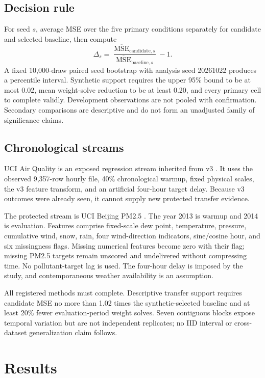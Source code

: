 \documentclass[10pt]{article}
\begin{document}
\subsection{Decision rule}
For seed $s$, average MSE over the five primary conditions separately for candidate and selected baseline, then compute
\[
 \Delta_s=\frac{\overline{\operatorname{MSE}}_{\mathrm{candidate},s}}
 {\overline{\operatorname{MSE}}_{\mathrm{baseline},s}}-1.
\]
A fixed 10,000-draw paired seed bootstrap with analysis seed 20261022 produces a percentile interval. Synthetic support requires the upper 95\% bound to be at most 0.02, mean weight-solve reduction to be at least 0.20, and every primary cell to complete validly. Development observations are not pooled with confirmation. Secondary comparisons are descriptive and do not form an unadjusted family of significance claims.

\subsection{Chronological streams}
UCI Air Quality is an exposed regression stream inherited from v3 \cite{air}. It uses the observed 9,357-row hourly file, 40\% chronological warmup, fixed physical scales, the v3 feature transform, and an artificial four-hour target delay. Because v3 outcomes were already seen, it cannot supply new protected transfer evidence.

The protected stream is UCI Beijing PM2.5 \cite{beijing}. The year 2013 is warmup and 2014 is evaluation. Features comprise fixed-scale dew point, temperature, pressure, cumulative wind, snow, rain, four wind-direction indicators, sine/cosine hour, and six missingness flags. Missing numerical features become zero with their flag; missing PM2.5 targets remain unscored and undelivered without compressing time. No pollutant-target lag is used. The four-hour delay is imposed by the study, and contemporaneous weather availability is an assumption.

All registered methods must complete. Descriptive transfer support requires candidate MSE no more than 1.02 times the synthetic-selected baseline and at least 20\% fewer evaluation-period weight solves. Seven contiguous blocks expose temporal variation but are not independent replicates; no IID interval or cross-dataset generalization claim follows.

\section{Results}

\end{document}
